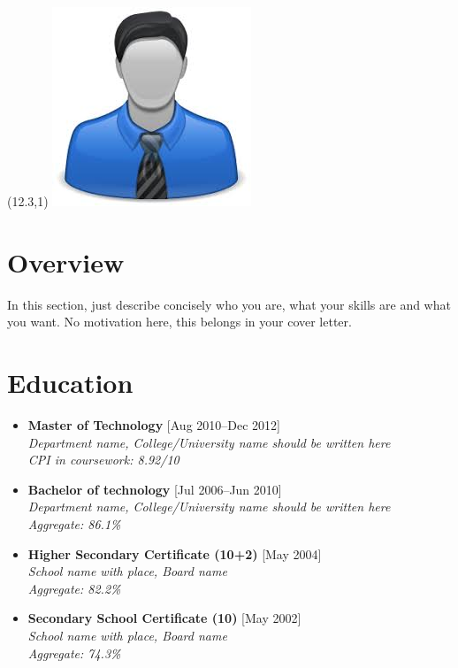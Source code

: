 \documentclass[11pt,a4paper]{moderncv}
\begin{document}
\hskip-2.5cm\makecvtitle
\begin{textblock}{0}(12.3,1)
\includegraphics[scale=0.4]{photo1}
\end{textblock}

\section{Overview}
In this section, just describe concisely who you are, what your skills are and what you want. No motivation here, this belongs in your cover letter.

\section{Education}

\begin{itemize}

\item \textbf{Master of Technology} \hfill [Aug 2010--Dec 2012]\\
\textit{Department name, College/University name should be written here\\ 
CPI in coursework: 8.92/10}

\item \textbf{Bachelor of technology} \hfill [Jul 2006--Jun 2010]\\
\textit{Department name, College/University name should be written here\\ 
Aggregate: 86.1\%}

\item \textbf{Higher Secondary Certificate (10+2)} \hfill [May 2004]\\
\textit{School name with place, Board name \\ 
Aggregate: 82.2\%}

\item \textbf{Secondary School Certificate (10)} \hfill [May 2002]\\
\textit{School name with place, Board name\\ 
Aggregate: 74.3\%}

\end{itemize}
\end{document}
